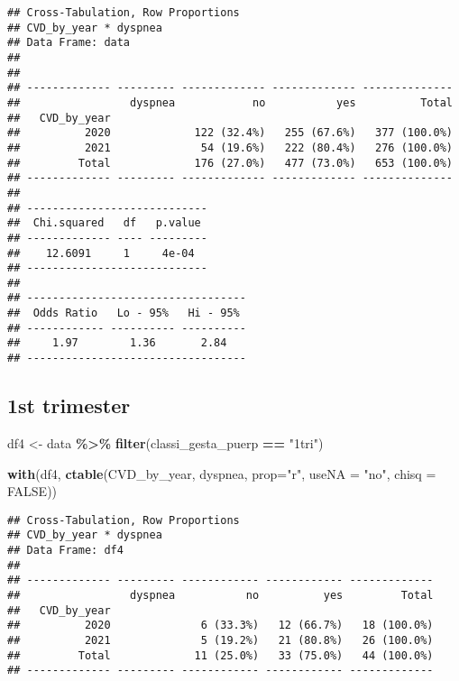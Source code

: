 \documentclass[
]{article}
\newenvironment{Shaded}{\begin{snugshade}}{\end{snugshade}}
\newcommand{\AttributeTok}[1]{\textcolor[rgb]{0.13,0.29,0.53}{#1}}
\newcommand{\ConstantTok}[1]{\textcolor[rgb]{0.56,0.35,0.01}{#1}}
\newcommand{\FunctionTok}[1]{\textcolor[rgb]{0.13,0.29,0.53}{\textbf{#1}}}
\newcommand{\NormalTok}[1]{#1}
\newcommand{\OtherTok}[1]{\textcolor[rgb]{0.56,0.35,0.01}{#1}}
\newcommand{\SpecialCharTok}[1]{\textcolor[rgb]{0.81,0.36,0.00}{\textbf{#1}}}
\newcommand{\StringTok}[1]{\textcolor[rgb]{0.31,0.60,0.02}{#1}}
\begin{document}
\begin{verbatim}
## Cross-Tabulation, Row Proportions  
## CVD_by_year * dyspnea  
## Data Frame: data  
## 
## 
## ------------- --------- ------------- ------------- --------------
##                 dyspnea            no           yes          Total
##   CVD_by_year                                                     
##          2020             122 (32.4%)   255 (67.6%)   377 (100.0%)
##          2021              54 (19.6%)   222 (80.4%)   276 (100.0%)
##         Total             176 (27.0%)   477 (73.0%)   653 (100.0%)
## ------------- --------- ------------- ------------- --------------
## 
## ----------------------------
##  Chi.squared   df   p.value 
## ------------- ---- ---------
##    12.6091     1     4e-04  
## ----------------------------
## 
## ----------------------------------
##  Odds Ratio   Lo - 95%   Hi - 95% 
## ------------ ---------- ----------
##     1.97        1.36       2.84   
## ----------------------------------
\end{verbatim}

\hypertarget{st-trimester}{%
\subsection{1st trimester}\label{st-trimester}}

\begin{Shaded}
\begin{Highlighting}[]
\NormalTok{df4 }\OtherTok{\textless{}{-}}\NormalTok{ data }\SpecialCharTok{\%\textgreater{}\%} 
  \FunctionTok{filter}\NormalTok{(classi\_gesta\_puerp }\SpecialCharTok{==} \StringTok{"1tri"}\NormalTok{)}

\FunctionTok{with}\NormalTok{(df4, }\FunctionTok{ctable}\NormalTok{(CVD\_by\_year, dyspnea, }\AttributeTok{prop=}\StringTok{"r"}\NormalTok{, }\AttributeTok{useNA =} \StringTok{"no"}\NormalTok{, }\AttributeTok{chisq =} \ConstantTok{FALSE}\NormalTok{))}
\end{Highlighting}
\end{Shaded}

\begin{verbatim}
## Cross-Tabulation, Row Proportions  
## CVD_by_year * dyspnea  
## Data Frame: df4  
## 
## ------------- --------- ------------ ------------ -------------
##                 dyspnea           no          yes         Total
##   CVD_by_year                                                  
##          2020              6 (33.3%)   12 (66.7%)   18 (100.0%)
##          2021              5 (19.2%)   21 (80.8%)   26 (100.0%)
##         Total             11 (25.0%)   33 (75.0%)   44 (100.0%)
## ------------- --------- ------------ ------------ -------------
\end{verbatim}
\end{document}
